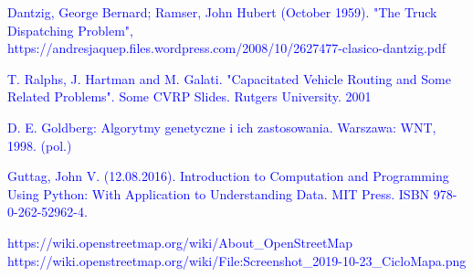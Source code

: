 \documentclass[a4paper, twoside, 12pt, justified]{article}
\begin{document}
	\newpage
	\renewcommand\refname{Źródła}
	\begin{thebibliography}{}
		{\hypertarget{vrp}{\textcolor{blue}{
		 Dantzig, George Bernard; Ramser, John Hubert (October 1959). "The Truck Dispatching Problem", https://andresjaquep.files.wordpress.com/2008/10/2627477-clasico-dantzig.pdf}}}
		
		{\hypertarget{cvrp}{\textcolor{blue}{T. Ralphs, J. Hartman and M. Galati. "Capacitated Vehicle Routing and Some Related Problems". Some CVRP Slides. Rutgers University. 2001}}}
		
		{\hypertarget{ag}{\textcolor{blue}{
		D. E. Goldberg: Algorytmy genetyczne i ich zastosowania. Warszawa: WNT, 1998. (pol.)}}}
	
		{\hypertarget{python}{\textcolor{blue}{
		 Guttag, John V. (12.08.2016). Introduction to Computation and Programming Using Python: With Application to Understanding Data. MIT Press. ISBN 978-0-262-52962-4.}}}
	 
	 	{\hypertarget{osm}{\textcolor{blue}{
		https://wiki.openstreetmap.org/wiki/About\_OpenStreetMap}}}
		{\hypertarget{osm_example}{\textcolor{blue}{
		https://wiki.openstreetmap.org/wiki/File:Screenshot\_2019-10-23\_CicloMapa.png
		}}}

	\end{thebibliography}
	
	
	
\end{document}
